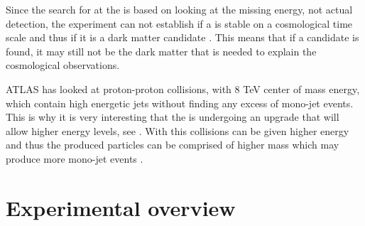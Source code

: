 Since the search for \abbrWIMPS at the \abbrLHC is based on looking at the missing energy, not actual detection, the experiment can not establish if a \abbrWIMP is stable on a cosmological time scale and thus if it is a dark matter candidate \citep{CERN-PH-EP-2012-210}. This means that if a candidate is found, it may still not be the dark matter that is needed to explain the cosmological observations.

ATLAS has looked at proton-proton collisions, with 8 TeV center of mass energy, which contain high energetic jets without finding any excess of mono-jet events. This is why it is very interesting that the \abbrLHC is undergoing an upgrade that will allow higher energy levels, see . With this collisions can be given higher energy and thus the produced particles can be comprised of higher mass which may produce more mono-jet events \citep{ATLAS:LOI2}.
\newpage
\section{Experimental overview}\label{sec:experiment}
